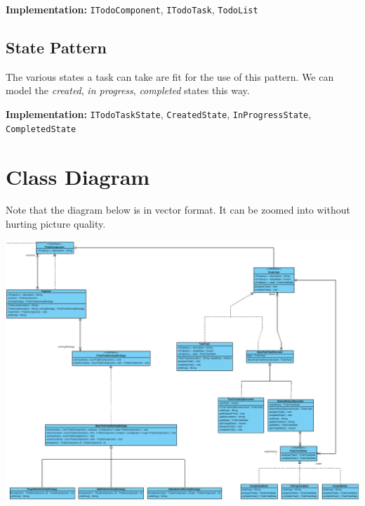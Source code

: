 \documentclass[a4paper, 12pt, titlepage]{article}
\begin{document}
  \textbf{Implementation:} \texttt{ITodoComponent}, \texttt{ITodoTask}, \texttt{TodoList}
  
  \subsection{State Pattern}
  
  The various states a task can take are fit for the use of this pattern.
  We can model the \textit{created}, \textit{in progress}, \textit{completed} states this way.
  
  \textbf{Implementation:} \texttt{ITodoTaskState}, \texttt{CreatedState}, \texttt{InProgressState},\\ \texttt{CompletedState}
  
  \pagebreak
  \section{Class Diagram}
  
  Note that the diagram below is in vector format.
  It can be zoomed into without hurting picture quality.
  \vspace{2em}
  
  \begin{center}
    \includegraphics[width=\textwidth]{class_diag}
  \end{center}
  
\end{document}
